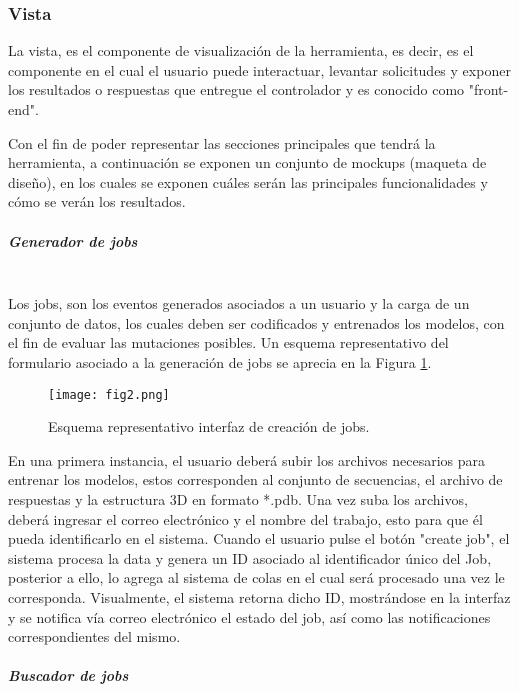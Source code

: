 \subsubsection{Vista}

La vista, es el componente de visualización de la herramienta, es decir, es el componente en el cual el usuario puede interactuar, levantar solicitudes y exponer los resultados o respuestas que entregue el controlador y es conocido como "front-end".

Con el fin de poder representar las secciones principales que tendrá la herramienta, a continuación se exponen un conjunto de mockups (maqueta de diseño), en los cuales se exponen cuáles serán las principales funcionalidades y cómo se verán los resultados.

\subparagraph{Generador de jobs\\\\}

Los jobs, son los eventos generados asociados a un usuario y la carga de un conjunto de datos, los cuales deben ser codificados y entrenados los modelos, con el fin de evaluar las mutaciones posibles. Un esquema representativo del formulario asociado a la generación de jobs se aprecia en la Figura \ref{cap4:fig2}.

\begin{figure}[!h]
	
	\centering
	\texttt{[image: fig2.png]}
	\caption{Esquema representativo interfaz de creación de jobs.}
	\label{cap4:fig2}
\end{figure}

En una primera instancia, el usuario deberá subir los archivos necesarios para entrenar los modelos, estos corresponden al conjunto de secuencias, el archivo de respuestas y la estructura 3D en formato *.pdb. Una vez suba los archivos, deberá ingresar el correo electrónico y el nombre del trabajo, esto para que él pueda identificarlo en el sistema. Cuando el usuario pulse el botón "create job", el sistema procesa la data y genera un ID asociado al identificador único del Job, posterior a ello, lo agrega al sistema de colas en el cual será procesado una vez le corresponda. Visualmente, el sistema retorna dicho ID, mostrándose en la interfaz y se notifica vía correo electrónico el estado del job, así como las notificaciones correspondientes del mismo.

\subparagraph{Buscador de jobs\\\\}

